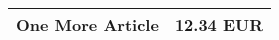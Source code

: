 \documentclass{article}
\begin{document}
\begin{center}
\begin{tabular}{ l r }
\hline

One More Article & 12.34 EUR \\ \hline
\hline
\end{tabular}
\end{center}
\end{document}
